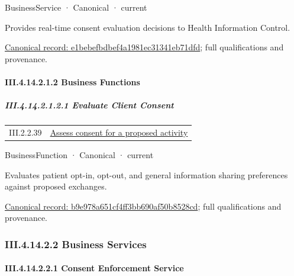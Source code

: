 \label{element:e1bebefbdbef4a1981ec31341eb71dfd}
{\small BusinessService · Canonical · current}\par

Provides real-time consent evaluation decisions to Health Information Control.


{\footnotesize \href{../../../../../../../continuum/business/business-service/e1bebefbdbef4a1981ec31341eb71dfd.md}{Canonical record: e1bebefbdbef4a1981ec31341eb71dfd}; full qualifications and provenance.}\par
\paragraph*{III.4.14.2.1.2 Business Functions}
\label{navigation:III.4.14.2.1.2}

\subparagraph*{III.4.14.2.1.2.1 Evaluate Client Consent}
\label{navigation:III.4.14.2.1.2.1}

\begin{longtable}{p{.22\linewidth}p{.73\linewidth}}
III.2.2.39 & \hyperref[element:17c66eb17d6040d09e250e787be71719]{Assess consent for a proposed activity} \\
\end{longtable}
\label{element:b9e978a651cf4ff3bb690af50b8528cd}
{\small BusinessFunction · Canonical · current}\par

Evaluates patient opt-in, opt-out, and general information sharing preferences against proposed exchanges.


{\footnotesize \href{../../../../../../../continuum/business/business-function/b9e978a651cf4ff3bb690af50b8528cd.md}{Canonical record: b9e978a651cf4ff3bb690af50b8528cd}; full qualifications and provenance.}\par
\subsubsection*{III.4.14.2.2 Business Services}
\label{navigation:III.4.14.2.2}

\paragraph*{III.4.14.2.2.1 Consent Enforcement Service}
\label{navigation:III.4.14.2.2.1}

